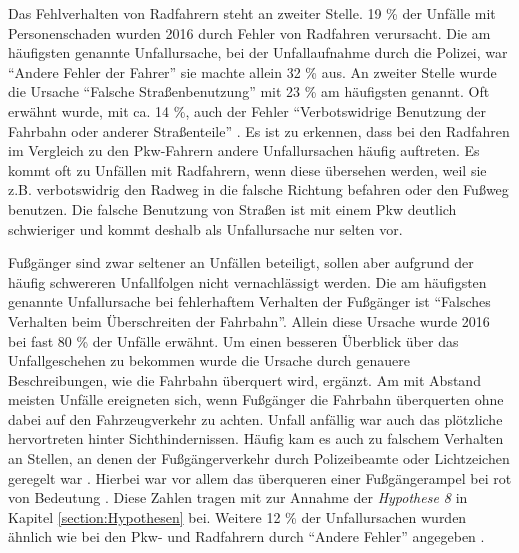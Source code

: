 Das Fehlverhalten von Radfahrern steht an zweiter Stelle. 19 \% der Unfälle mit Personenschaden wurden 2016 durch Fehler von Radfahren verursacht. Die am häufigsten genannte Unfallursache, bei der Unfallaufnahme durch die Polizei, war \enquote{Andere Fehler der Fahrer} sie machte allein 32 \% aus. An zweiter Stelle wurde die Ursache \enquote{Falsche Straßenbenutzung} mit 23 \% am häufigsten genannt. Oft erwähnt wurde, mit ca. 14 \%, auch der Fehler \enquote{Verbotswidrige Benutzung der Fahrbahn oder anderer Straßenteile} \parencite[S. 274-277]{StatistischesBundesamt.2018b}. Es ist zu erkennen, dass bei den Radfahren im Vergleich zu den Pkw-Fahrern andere Unfallursachen häufig auftreten. Es kommt oft zu Unfällen mit Radfahrern, wenn diese übersehen werden, weil sie z.B. verbotswidrig den Radweg in die falsche Richtung befahren oder den Fußweg benutzen. Die falsche Benutzung von Straßen ist mit einem Pkw deutlich schwieriger und kommt deshalb als Unfallursache nur selten vor.

Fußgänger sind zwar seltener an Unfällen beteiligt, sollen aber aufgrund der häufig schwereren Unfallfolgen nicht vernachlässigt werden. Die am häufigsten genannte Unfallursache bei fehlerhaftem Verhalten der Fußgänger ist \enquote{Falsches Verhalten beim Überschreiten der Fahrbahn}. Allein diese Ursache wurde 2016 bei fast 80 \% der Unfälle erwähnt. Um einen besseren Überblick über das Unfallgeschehen zu bekommen wurde die Ursache durch genauere Beschreibungen, wie die Fahrbahn überquert wird, ergänzt. Am mit Abstand meisten Unfälle ereigneten sich, wenn Fußgänger die Fahrbahn überquerten ohne dabei auf den Fahrzeugverkehr zu achten. Unfall anfällig war auch das plötzliche hervortreten hinter Sichthindernissen. Häufig kam es auch zu falschem Verhalten an Stellen, an denen der Fußgängerverkehr durch Polizeibeamte oder Lichtzeichen geregelt war \parencite[S. 304]{StatistischesBundesamt.2018b}. Hierbei war vor allem das überqueren einer Fußgängerampel bei rot von Bedeutung \parencite[S. 222]{Schreiber.2014}. Diese Zahlen tragen mit zur Annahme der \textit{Hypothese 8} in Kapitel \ref{section:Hypothesen} bei. Weitere 12 \% der Unfallursachen wurden ähnlich wie bei den Pkw- und Radfahrern durch \enquote{Andere Fehler} angegeben \parencite[S. 304]{StatistischesBundesamt.2018b}.

